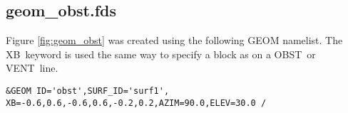 \documentclass[12pt]{article}
\begin{document}
%
%
%
%
%
%

\subsection{geom\_obst.fds}
Figure \ref{fig:geom_obst} was created using the following GEOM namelist.
The {\ct XB}\ keyword is used the same way to specify a block as on
a {\ct OBST}\ or {\ct VENT}\ line.

{\scriptsize
\begin{verbatim}
&GEOM ID='obst',SURF_ID='surf1', XB=-0.6,0.6,-0.6,0.6,-0.2,0.2,AZIM=90.0,ELEV=30.0 /
\end{verbatim}
}
\end{document}
